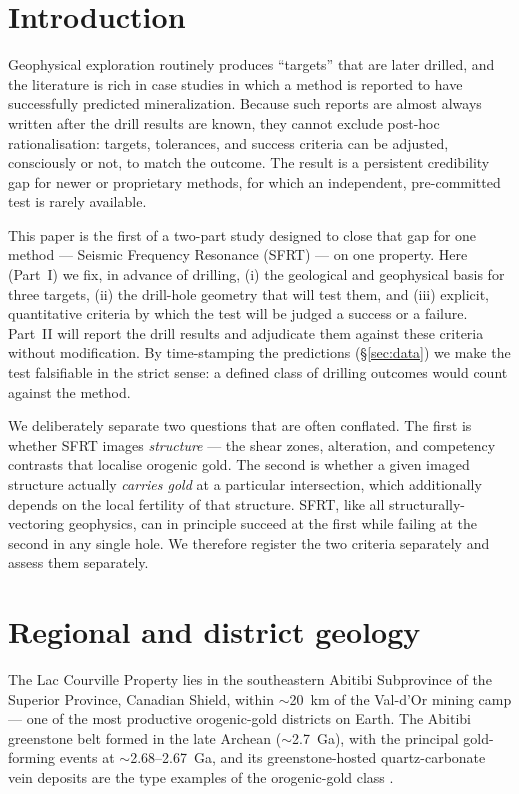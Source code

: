 \documentclass[11pt]{article}
\begin{document}
\section{Introduction}
Geophysical exploration routinely produces ``targets'' that are later drilled, and the
literature is rich in case studies in which a method is reported to have successfully predicted
mineralization. Because such reports are almost always written after the drill results are
known, they cannot exclude post-hoc rationalisation: targets, tolerances, and success criteria
can be adjusted, consciously or not, to match the outcome. The result is a persistent
credibility gap for newer or proprietary methods, for which an independent, pre-committed test
is rarely available.

This paper is the first of a two-part study designed to close that gap for one method ---
Seismic Frequency Resonance (SFRT) --- on one property. Here (Part~I) we fix, in advance of
drilling, (i) the geological and geophysical basis for three targets, (ii) the drill-hole
geometry that will test them, and (iii) explicit, quantitative criteria by which the test will
be judged a success or a failure. Part~II will report the drill results and adjudicate them
against these criteria without modification. By time-stamping the predictions (\S\ref{sec:data})
we make the test falsifiable in the strict sense: a defined class of drilling outcomes would
count against the method.

We deliberately separate two questions that are often conflated. The first is whether SFRT
images \emph{structure} --- the shear zones, alteration, and competency contrasts that localise
orogenic gold. The second is whether a given imaged structure actually \emph{carries gold} at a
particular intersection, which additionally depends on the local fertility of that structure.
SFRT, like all structurally-vectoring geophysics, can in principle succeed at the first while
failing at the second in any single hole. We therefore register the two criteria separately and
assess them separately.

\section{Regional and district geology}
The Lac Courville Property lies in the southeastern Abitibi Subprovince of the Superior Province,
Canadian Shield, within $\sim$20~km of the Val-d'Or mining camp --- one of the most productive
orogenic-gold districts on Earth. The Abitibi greenstone belt formed in the late Archean
($\sim$2.7~Ga), with the principal gold-forming events at $\sim$2.68--2.67~Ga, and its
greenstone-hosted quartz-carbonate vein deposits are the type examples of the orogenic-gold
class \citep{dube2007}.
\end{document}
